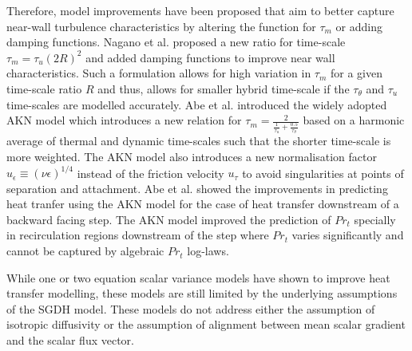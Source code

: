 Therefore, model improvements have been proposed that aim to better capture near-wall turbulence characteristics by altering the function for $\tau_{m}$ or adding damping functions. Nagano et al. \cite{Nagano1991} proposed a new ratio for time-scale $\tau_{m} = \tau_{u}(2R)^{2}$ and added damping functions to improve near wall characteristics. Such a formulation allows for high variation in $\tau_{m}$ for a given time-scale ratio $R$ and thus, allows for smaller hybrid time-scale if the $\tau_{\theta}$ and $\tau_{u}$ time-scales are modelled accurately. Abe et al. \cite{Abe1995} introduced the widely adopted AKN model which introduces a new relation for $\tau_{m} = \frac{2}{\frac{1}{\tau_{u}} + \frac{0.5}{\tau_{\theta}}}$ based on a harmonic average of thermal and dynamic time-scales such that the shorter time-scale is more weighted. The AKN model also introduces a new normalisation factor $u_{\epsilon} \equiv \left(\nu \epsilon\right)^{1/4}$ instead of the friction velocity $u_{\tau}$ to avoid singularities at points of separation and attachment. Abe et al. \cite{Abe1995} showed the improvements in predicting heat tranfer using the AKN model for the case of heat transfer downstream of a backward facing step. The AKN model improved the prediction of $Pr_{t}$ specially in recirculation regions downstream of the step where $Pr_{t}$ varies significantly and cannot be captured by algebraic $Pr_{t}$ log-laws.

While one or two equation scalar variance models have shown to improve heat transfer modelling, these models are still limited by the underlying assumptions of the SGDH model. These models do not address either the assumption of isotropic diffusivity or the assumption of alignment between mean scalar gradient and the scalar flux vector.  

